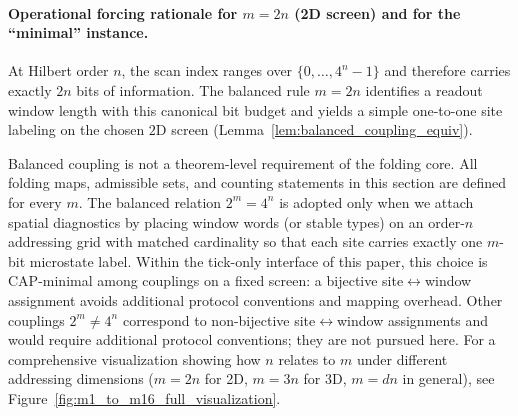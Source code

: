 \paragraph{Operational forcing rationale for \texorpdfstring{$m=2n$}{m=2n} (2D screen) and for the ``minimal'' instance.}
At Hilbert order $n$, the scan index ranges over $\{0,\dots,4^n-1\}$ and therefore carries exactly $2n$ bits of information.
The balanced rule $m=2n$ identifies a readout window length with this canonical bit budget and yields a simple one-to-one site labeling on the chosen $2$D screen (Lemma~\ref{lem:balanced_coupling_equiv}).
\begin{remark}\label{rem:balanced_coupling_convention}
Balanced coupling is not a theorem-level requirement of the folding core.
All folding maps, admissible sets, and counting statements in this section are defined for every $m$.
The balanced relation $2^m=4^n$ is adopted only when we attach spatial diagnostics by placing window words (or stable types) on an order-$n$ addressing grid with matched cardinality so that each site carries exactly one $m$-bit microstate label.
Within the tick-only interface of this paper, this choice is CAP-minimal among couplings on a fixed screen: a bijective site$\leftrightarrow$window assignment avoids additional protocol conventions and mapping overhead.
Other couplings $2^m\neq 4^n$ correspond to non-bijective site$\leftrightarrow$window assignments and would require additional protocol conventions; they are not pursued here.
For a comprehensive visualization showing how $n$ relates to $m$ under different addressing dimensions ($m=2n$ for 2D, $m=3n$ for 3D, $m=dn$ in general), see Figure~\ref{fig:m1_to_m16_full_visualization}.
\end{remark}
